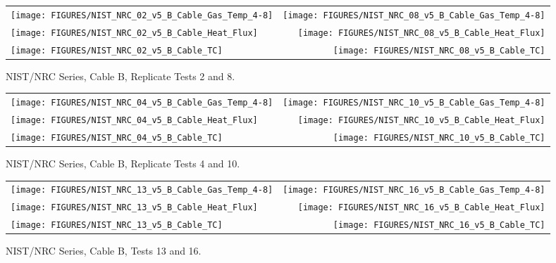 \begin{figure}[h]
\begin{tabular*}{\textwidth}{l@{\extracolsep{\fill}}r}
\texttt{[image: FIGURES/NIST\_NRC\_02\_v5\_B\_Cable\_Gas\_Temp\_4-8]} &
\texttt{[image: FIGURES/NIST\_NRC\_08\_v5\_B\_Cable\_Gas\_Temp\_4-8]} \\
\texttt{[image: FIGURES/NIST\_NRC\_02\_v5\_B\_Cable\_Heat\_Flux]} &
\texttt{[image: FIGURES/NIST\_NRC\_08\_v5\_B\_Cable\_Heat\_Flux]} \\
\texttt{[image: FIGURES/NIST\_NRC\_02\_v5\_B\_Cable\_TC]} &
\texttt{[image: FIGURES/NIST\_NRC\_08\_v5\_B\_Cable\_TC]}
\end{tabular*}
\caption{NIST/NRC Series, Cable B, Replicate Tests 2 and 8.}
\label{NIST_NRC_B_2_and_8}
\end{figure}

\begin{figure}[h]
\begin{tabular*}{\textwidth}{l@{\extracolsep{\fill}}r}
\texttt{[image: FIGURES/NIST\_NRC\_04\_v5\_B\_Cable\_Gas\_Temp\_4-8]} &
\texttt{[image: FIGURES/NIST\_NRC\_10\_v5\_B\_Cable\_Gas\_Temp\_4-8]} \\
\texttt{[image: FIGURES/NIST\_NRC\_04\_v5\_B\_Cable\_Heat\_Flux]} &
\texttt{[image: FIGURES/NIST\_NRC\_10\_v5\_B\_Cable\_Heat\_Flux]} \\
\texttt{[image: FIGURES/NIST\_NRC\_04\_v5\_B\_Cable\_TC]} &
\texttt{[image: FIGURES/NIST\_NRC\_10\_v5\_B\_Cable\_TC]}
\end{tabular*}
\caption{NIST/NRC Series, Cable B, Replicate Tests 4 and 10.}
\label{NIST_NRC_B_4_and_10}
\end{figure}

\begin{figure}[h]
\begin{tabular*}{\textwidth}{l@{\extracolsep{\fill}}r}
\texttt{[image: FIGURES/NIST\_NRC\_13\_v5\_B\_Cable\_Gas\_Temp\_4-8]} &
\texttt{[image: FIGURES/NIST\_NRC\_16\_v5\_B\_Cable\_Gas\_Temp\_4-8]} \\
\texttt{[image: FIGURES/NIST\_NRC\_13\_v5\_B\_Cable\_Heat\_Flux]} &
\texttt{[image: FIGURES/NIST\_NRC\_16\_v5\_B\_Cable\_Heat\_Flux]} \\
\texttt{[image: FIGURES/NIST\_NRC\_13\_v5\_B\_Cable\_TC]} &
\texttt{[image: FIGURES/NIST\_NRC\_16\_v5\_B\_Cable\_TC]}
\end{tabular*}
\caption{NIST/NRC Series, Cable B, Tests 13 and 16.}
\label{NIST_NRC_B_13_and_16}
\end{figure}

